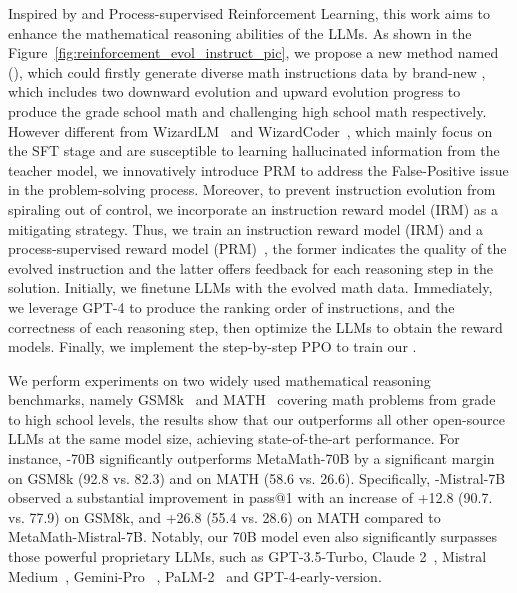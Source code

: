 Inspired by \EIname{} and Process-supervised Reinforcement Learning, this work aims to enhance the  mathematical reasoning abilities of the LLMs. As shown in the Figure~\ref{fig:reinforcement_evol_instruct_pic}, we propose a new method named \REInameF{} (\textbf{\REInameS{}}), which could firstly generate diverse math instructions data by brand-new \MathEIname{}, which includes two downward  evolution and upward evolution progress to produce the grade school math and  challenging high school math respectively. However different from WizardLM~\citep{xu2023wizardlm} and WizardCoder~\citep{luo2023wizardcoder}, which mainly focus on the SFT stage and are susceptible to learning hallucinated information from the teacher model, we innovatively introduce PRM to address the False-Positive issue in the problem-solving process. Moreover, to prevent instruction evolution from spiraling out of control, we incorporate an instruction reward model (IRM) as a mitigating strategy.  Thus, we train an instruction  reward model (IRM) and a process-supervised reward model (PRM)~\citep{lightman2023openai-verify-step-by-step,uesato2022deepmind-orms, wang2024-mathshepherd, chen2024-autoprm}, the former indicates the quality of the evolved instruction and the latter offers feedback for each reasoning step in the  solution. Initially, we finetune LLMs with the evolved math data. Immediately, we leverage GPT-4 to produce the ranking order of instructions, and the correctness of each reasoning step, then optimize the LLMs to obtain the reward models. Finally, we implement the step-by-step PPO to train our \modelname{}.

We perform experiments on two widely used mathematical reasoning benchmarks, namely GSM8k~\citep{cobbe2021training_gsm8k_2} and MATH~\citep{hendrycks2021measuring} covering math problems from grade to high school levels, the results show that our \modelname{} outperforms all other open-source LLMs at the same model size, achieving state-of-the-art performance. For instance, \modelname{}-70B significantly outperforms MetaMath-70B by a
significant margin on GSM8k (92.8 vs. 82.3) and on MATH (58.6 vs. 26.6). Specifically, \modelname{}-Mistral-7B observed a substantial improvement in pass@1 with an increase of +12.8 (90.7. vs. 77.9) on GSM8k, and +26.8 (55.4 vs. 28.6) on MATH compared to MetaMath-Mistral-7B. Notably, our 70B model even also significantly surpasses those powerful proprietary LLMs, such as GPT-3.5-Turbo,  Claude 2~\citep{bai2022constitutional-claude}, Mistral Medium~\citep{jiang2024mixtral}, Gemini-Pro ~\citep{geminiteam2023gemini}, PaLM-2~\citep{palm2} and GPT-4-early-version.

